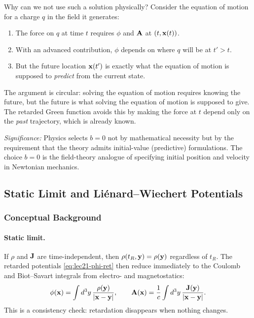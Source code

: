 Why can we not use such a solution physically? Consider the equation of motion for a
charge $q$ in the field it generates:
\begin{enumerate}
  \item The force on $q$ at time $t$ requires $\phi$ and $\mathbf{A}$ at $(t,\mathbf{x}(t))$.
  \item With an advanced contribution, $\phi$ depends on where $q$ will be at $t'>t$.
  \item But the future location $\mathbf{x}(t')$ is exactly what the equation of motion
        is supposed to \emph{predict} from the current state.
\end{enumerate}
The argument is circular: solving the equation of motion requires knowing the future,
but the future is what solving the equation of motion is supposed to give.
The retarded Green function avoids this by making the force at $t$ depend only on the
\emph{past} trajectory, which is already known.

\textit{Significance:} Physics selects $b=0$ not by mathematical necessity but by the
requirement that the theory admits initial-value (predictive) formulations. The
choice $b=0$ is the field-theory analogue of specifying initial position and velocity
in Newtonian mechanics.


\subsection{Static Limit and Liénard--Wiechert Potentials}
\label{subsec:lec21-static-lw}

\subsubsection*{Conceptual Background}
\paragraph{Static limit.}
If $\rho$ and $\mathbf{J}$ are time-independent, then $\rho(t_R,\mathbf{y}) = \rho(\mathbf{y})$
regardless of $t_R$. The retarded potentials \eqref{eq:lec21-phi-ret} then reduce
immediately to the Coulomb and Biot--Savart integrals from electro- and magnetostatics:
\begin{equation}\label{eq:lec21-static-limit}
  \phi(\mathbf{x}) = \int d^3y\,\frac{\rho(\mathbf{y})}{|\mathbf{x}-\mathbf{y}|},
  \qquad
  \mathbf{A}(\mathbf{x}) = \frac{1}{c}\int d^3y\,\frac{\mathbf{J}(\mathbf{y})}{|\mathbf{x}-\mathbf{y}|}.
\end{equation}
This is a consistency check: retardation disappears when nothing changes.


